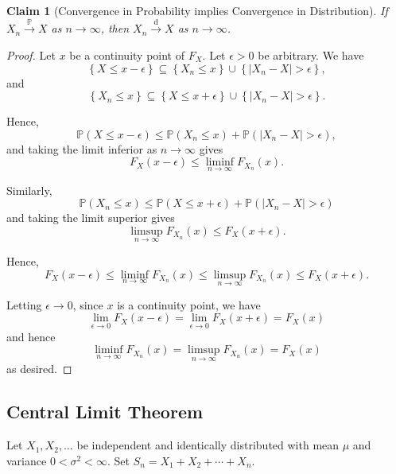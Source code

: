 \documentclass[11pt]{article}
\numberwithin{equation}{section}
\newtheorem{claim}[theorem]{Claim}
\theoremstyle{definition}
\theoremstyle{remark}
\newcommand{\pqty}[1]{\left(#1\right)}
\newcommand{\Bqty}[1]{\left\{#1\right\}}
\newcommand{\abs}[1]{\left|#1\right|}
\newcommand{\Prob}{\mathbb P}
\newcommand{\toProb}{\xrightarrow{\mathbb P}}
\newcommand{\toDist}{\xrightarrow{\mathrm d}}
\begin{document}
\begin{claim}[Convergence in Probability implies Convergence in Distribution]\label{probability-claim-009}
    \label{probability-claim:convergence-in-probability-implies-converges-in-distribution}%
    If \(X_n \toProb X\) as \(n \to \infty\), then \(X_n \toDist X\) as \(n \to \infty\).
\end{claim}

\begin{proof}\label{probability-proof-092}
    Let \(x\) be a continuity point of \(F_X\). Let \(\epsilon > 0\) be arbitrary. We have
    \[
        \Bqty{X \leq x - \epsilon} \subseteq \Bqty{X_n \leq x} \cup \Bqty{\abs{X_n - X} > \epsilon},
    \]
    and
    \[
        \Bqty{X_n \leq x} \subseteq \Bqty{X \leq x + \epsilon} \cup \Bqty{\abs{X_n - X} > \epsilon}.
    \]

    Hence,
    \[
        \Prob\pqty{X \leq x - \epsilon} \leq \Prob\pqty{X_n \leq x} + \Prob\pqty{\abs{X_n - X} > \epsilon},
    \]
    and taking the limit inferior as \(n \to \infty\) gives
    \[
        F_X \pqty{x - \epsilon} \leq \liminf_{n \to \infty} F_{X_n} \pqty{x}.
    \]

    Similarly,
    \[
        \Prob\pqty{X_n \leq x} \leq \Prob\pqty{X \leq x + \epsilon} + \Prob\pqty{\abs{X_n - X} > \epsilon}
    \]
    and taking the limit superior gives
    \[
        \limsup_{n \to \infty} F_{X_n} \pqty{x} \leq F_X \pqty{x + \epsilon}.
    \]

    Hence,
    \[
        F_{X} \pqty{x - \epsilon} \leq \liminf_{n \to \infty} F_{X_n} \pqty{x} \leq \limsup_{n \to \infty} F_{X_n} \pqty{x} \leq F_X \pqty{x + \epsilon}.
    \]

    Letting \(\epsilon \to 0\), since \(x\) is a continuity point, we have
    \[
        \lim_{\epsilon \to 0} F_X\pqty{x - \epsilon} = \lim_{\epsilon \to 0} F_X\pqty{x + \epsilon} = F_X\pqty{x}
    \]
    and hence
    \[
        \liminf_{n \to \infty} F_{X_n} \pqty{x} = \limsup_{n \to \infty} F_{X_n} \pqty{x} = F_X \pqty{x}
    \]
    as desired.
\end{proof}

\subsection{Central Limit Theorem}

Let \(X_1, X_2, \ldots\) be independent and identically distributed with mean \(\mu\) and variance \(0<\sigma^2<\infty\). Set \(S_n = X_1 + X_2 + \cdots + X_n\).
\end{document}
